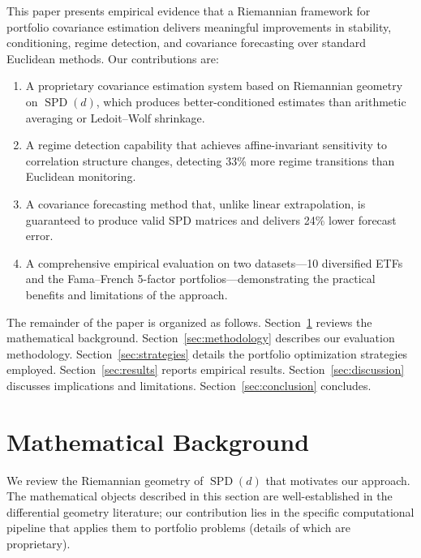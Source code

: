 \documentclass[12pt,a4paper]{article}
\DeclareMathOperator{\SPD}{SPD}
\begin{document}
This paper presents empirical evidence that a Riemannian framework for
portfolio covariance estimation delivers meaningful improvements in stability,
conditioning, regime detection, and covariance forecasting over standard
Euclidean methods. Our contributions are:
\begin{enumerate}[label=(\arabic*)]
    \item A proprietary covariance estimation system based on Riemannian
    geometry on $\SPD(d)$, which produces better-conditioned estimates than
    arithmetic averaging or Ledoit--Wolf shrinkage.

    \item A regime detection capability that achieves affine-invariant
    sensitivity to correlation structure changes, detecting 33\% more
    regime transitions than Euclidean monitoring.

    \item A covariance forecasting method that, unlike linear extrapolation,
    is guaranteed to produce valid SPD matrices and delivers 24\% lower
    forecast error.

    \item A comprehensive empirical evaluation on two datasets---10
    diversified ETFs and the Fama--French 5-factor portfolios---demonstrating
    the practical benefits and limitations of the approach.
\end{enumerate}

The remainder of the paper is organized as follows. Section~\ref{sec:math}
reviews the mathematical background. Section~\ref{sec:methodology} describes
our evaluation methodology. Section~\ref{sec:strategies} details the portfolio
optimization strategies employed. Section~\ref{sec:results} reports empirical
results. Section~\ref{sec:discussion} discusses implications and limitations.
Section~\ref{sec:conclusion} concludes.


\section{Mathematical Background}\label{sec:math}

We review the Riemannian geometry of $\SPD(d)$ that motivates our approach.
The mathematical objects described in this section are well-established in
the differential geometry literature; our contribution lies in the specific
computational pipeline that applies them to portfolio problems (details of
which are proprietary).
\end{document}
